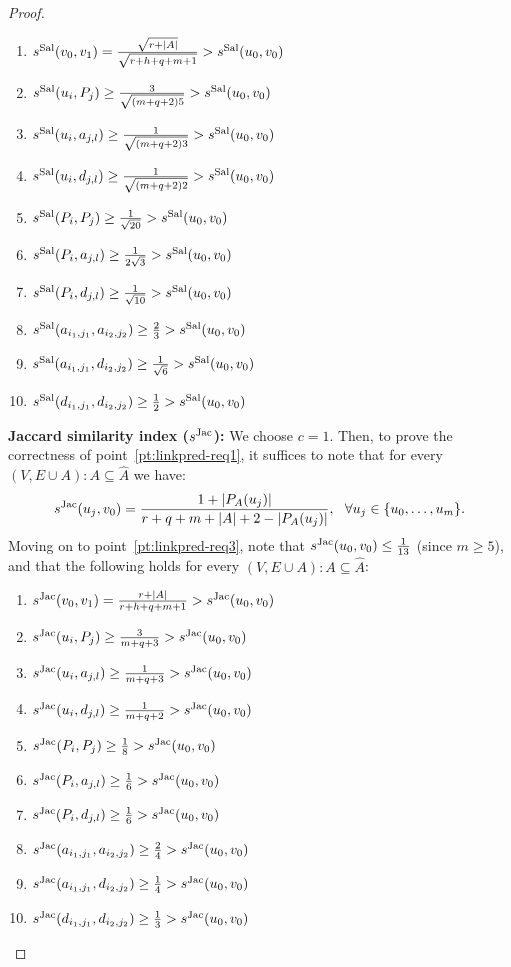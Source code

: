 \documentclass[twocolumn]{article}
\newcommand{\FA}{\widehat{A}}
\newcommand{\PA}{P_{A}}
\newcommand{\sSal}{s^{\text{\normalfont Sal}}}
\newcommand{\sJac}{s^{\text{\normalfont Jac}}}
\begin{document}
\begin{proof}
\begin{enumerate}[label=(\roman*),leftmargin=*]\itemsep0.5em
\item $\sSal(v_0,v_1)=\frac{\sqrt{r + |A|}}{\sqrt{r+h+q+m+1}} > \sSal(u_0,v_0)$
\item $\sSal(u_i,P_j) \geq \frac{3}{\sqrt{(m+q+2)5}} > \sSal(u_0,v_0)$
\item $\sSal(u_i,a_{j,l}) \geq \frac{1}{\sqrt{(m+q+2)3}} > \sSal(u_0,v_0)$
\item $\sSal(u_i,d_{j,l}) \geq \frac{1}{\sqrt{(m+q+2)2}} > \sSal(u_0,v_0)$
\item $\sSal(P_i,P_j) \geq \frac{1}{\sqrt{20}} > \sSal(u_0,v_0)$
\item $\sSal(P_i,a_{j,l}) \geq \frac{1}{2\sqrt{3}} > \sSal(u_0,v_0)$
\item $\sSal(P_i,d_{j,l}) \geq \frac{1}{\sqrt{10}} > \sSal(u_0,v_0)$
\item $\sSal(a_{i_1,j_1},a_{i_2,j_2}) \geq \frac{2}{3} > \sSal(u_0,v_0)$
\item $\sSal(a_{i_1,j_1},d_{i_2,j_2}) \geq \frac{1}{\sqrt{6}} > \sSal(u_0,v_0)$
\item $\sSal(d_{i_1,j_1},d_{i_2,j_2}) \geq \frac{1}{2} > \sSal(u_0,v_0)$
\end{enumerate}

\noindent \textbf{Jaccard similarity index ($\sJac$):} We choose $c=1$. Then, to prove the correctness of point~\ref{pt:linkpred-req1}, it suffices to note that for every $(V,E\cup A):A \subseteq \FA$ we have: $$
\sJac(u_j,v_0)=\frac{1+|\PA(u_j)|}{r+q+m+|A|+2-|\PA(u_j)|},\ \ \forall u_j\in\{u_0,\ldots, u_m\}.
$$
Moving on to point~\ref{pt:linkpred-req3}, note that $\sJac(u_0,v_0) \leq \frac{1}{13}$ (since $m \geq 5$), and that the following holds for every $(V,E\cup A):A \subseteq \FA$:

\begin{enumerate}[label=(\roman*),leftmargin=*]\itemsep0.5em
\item $\sJac(v_0,v_1)=\frac{r + |A|}{r+h+q+m+1} > \sJac(u_0,v_0)$
\item $\sJac(u_i,P_j) \geq \frac{3}{m+q+3} > \sJac(u_0,v_0)$
\item $\sJac(u_i,a_{j,l}) \geq \frac{1}{m+q+3} > \sJac(u_0,v_0)$
\item $\sJac(u_i,d_{j,l}) \geq \frac{1}{m+q+2} > \sJac(u_0,v_0)$
\item $\sJac(P_i,P_j) \geq \frac{1}{8} > \sJac(u_0,v_0)$
\item $\sJac(P_i,a_{j,l}) \geq \frac{1}{6} > \sJac(u_0,v_0)$
\item $\sJac(P_i,d_{j,l}) \geq \frac{1}{6} > \sJac(u_0,v_0)$
\item $\sJac(a_{i_1,j_1},a_{i_2,j_2}) \geq \frac{2}{4} > \sJac(u_0,v_0)$
\item $\sJac(a_{i_1,j_1},d_{i_2,j_2}) \geq \frac{1}{4} > \sJac(u_0,v_0)$
\item $\sJac(d_{i_1,j_1},d_{i_2,j_2}) \geq \frac{1}{3} > \sJac(u_0,v_0)$
\end{enumerate}


\end{proof}
\end{document}
